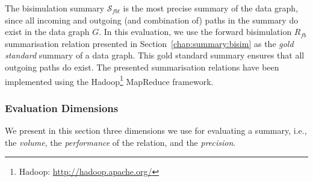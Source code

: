 The bisimulation summary $\mathcal{S}_{fbt}$ is the most precise summary of the data graph, since all incoming and outgoing (and combination of) paths in the summary do exist in the data graph $G$. In this evaluation, we use the forward bisimulation $R_{fb}$ summarisation relation presented in Section~\ref{chap:summary:bisim} as the \emph{gold standard} summary of a data graph. This gold standard summary ensures that all outgoing paths do exist. The presented summarisation relations have been implemented using the Hadoop\footnote{Hadoop: \url{http://hadoop.apache.org/}} MapReduce framework.

\subsubsection{Evaluation Dimensions}

We present in this section three dimensions we use for evaluating a summary, i.e., the \emph{volume}, the \emph{performance} of the relation, and the \emph{precision}.

